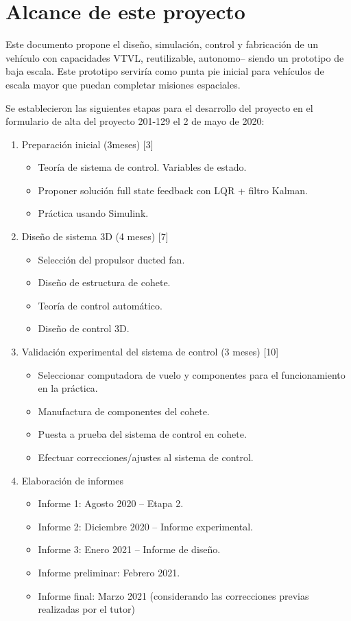 \null\newpage
\clearpage

\section{Alcance de este proyecto}
Este documento propone el diseño, simulación, control y fabricación de un vehículo con capacidades VTVL, reutilizable, autonomo-- siendo un prototipo de baja escala. Este prototipo serviría como punta pie inicial para vehículos de escala mayor que puedan completar misiones espaciales. 

Se establecieron las siguientes etapas para el desarrollo del proyecto en el formulario de alta del proyecto 201-129 el 2 de mayo de 2020:
\begin{enumerate}
    \item Preparación inicial (3meses) [3]
    \begin{itemize}
        \item Teoría de sistema de control. Variables de estado.
        \item Proponer solución full state feedback con LQR + filtro Kalman.
        \item Práctica usando Simulink.
    \end{itemize}
    \item Diseño de sistema 3D (4 meses) [7]
    \begin{itemize}
        \item Selección del propulsor ducted fan.
        \item Diseño de estructura de cohete.
        \item Teoría de control automático.
        \item Diseño de control 3D.
    \end{itemize}
    \item Validación experimental del sistema de control (3 meses) [10]
    \begin{itemize}
        \item Seleccionar computadora de vuelo y componentes para el funcionamiento en la práctica.
        \item Manufactura de componentes del cohete.
        \item Puesta a prueba del sistema de control en cohete.
        \item Efectuar correcciones/ajustes al sistema de control.
    \end{itemize}
    \item Elaboración de informes
    \begin{itemize}
        \item Informe 1: Agosto 2020 -- Etapa 2.
        \item Informe 2: Diciembre 2020 -- Informe experimental.
        \item Informe 3: Enero 2021 -- Informe de diseño.
        \item Informe preliminar: Febrero 2021.
        \item Informe final: Marzo 2021 (considerando las correcciones previas realizadas por el tutor)
    \end{itemize}
\end{enumerate}

